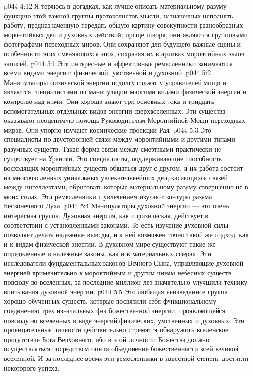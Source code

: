 \vs p044 4:12 \bibnobreakspace {} Я теряюсь в догадках, как лучше описать материальному разуму функцию этой важной группы протоколистов мысли, назначенных исполнять работу, предназначенную передать общую картину совокупности разнообразных моронтийных дел и духовных действий; проще говоря, они являются групповыми фотографами переходных миров. Они сохраняют для будущего важные сцены и особенности этих сменяющихся эпох, сохраняя их в архивах моронтийных залов записей.
\vs p044 5:1 Эти интересные и эффективные ремесленники занимаются всеми видами энергии: физической, умственной и духовной.
\vs p044 5:2 \bibnobreakspace {} Манипуляторы физической энергии подолгу служат у управителей мощи и являются специалистами по манипуляции многими видами физической энергии и контролю над ними. Они хорошо знают три основных тока и тридцать вспомогательных отдельных видов энергии сверхвселенных. Эти существа оказывают неоценимую помощь Руководителям Моронтийной Мощи переходных миров. Они упорно изучают космические проекции Рая.
\vs p044 5:3 \bibnobreakspace {} Это специалисты по двусторонней связи между моронтийными и другими типами разумных существ. Такая форма связи между смертными практически не существует на Урантии. Это специалисты, поддерживающие способность восходящих моронтийных существ общаться друг с другом, и их работа состоит из многочисленных уникальных увлекательнейших дел, касающихся связей между интеллектами, обрисовать которые материальному разуму совершенно не в моих силах. Эти ремесленники с увлечением изучают контуры разума Бесконечного Духа.
\vs p044 5:4 \bibnobreakspace {} Манипуляторы духовной энергии --- это очень интересная группа. Духовная энергия, как и физическая, действует в соответствии с установленными законами. То есть изучение духовной силы позволяет делать надежные выводы, и к ней возможен точно такой же подход, как и к видам физической энергии. В духовном мире существуют такие же определенные и надежные законы, как и в материальных сферах. Эти исследователи фундаментальных законов Вечного Сына, управляющие духовной энергией применительно к моронтийным и другим чинам небесных существ повсюду во вселенных, за последние миллион лет значительно улучшили технику впитывания духовной энергии.
\vs p044 5:5 \bibnobreakspace {} Это любящая неизведанное группа хорошо обученных существ, которые посвятили себя функциональному соединению трех изначальных фаз божественной энергии, проявляющейся повсюду во вселенных в виде энергий физических, умственных и духовных. Эти проницательные личности действительно стремятся обнаружить вселенское присутствие Бога Верховного, ибо в этой личности Божества должно осуществляться посредством опыта объединение божественности всей великой вселенной. И за последнее время эти ремесленники в известной степени достигли некоторого успеха.

